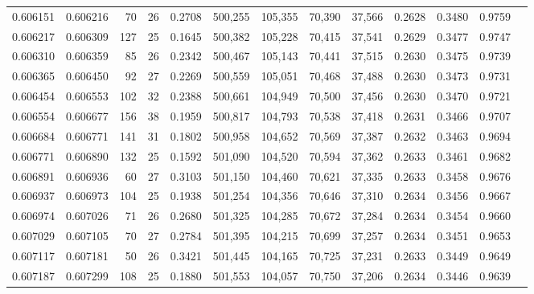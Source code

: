 \begin{tabular}{rrrrrrrrrrrrr}
0.606151 & 0.606216 &  70 &  26 &                                     0.2708 & 500,255 & 105,355 &  70,390 &  37,566 & 0.2628 & 0.3480 & 0.9759 \\
0.606217 & 0.606309 & 127 &  25 &                                     0.1645 & 500,382 & 105,228 &  70,415 &  37,541 & 0.2629 & 0.3477 & 0.9747 \\
0.606310 & 0.606359 &  85 &  26 &                                     0.2342 & 500,467 & 105,143 &  70,441 &  37,515 & 0.2630 & 0.3475 & 0.9739 \\
0.606365 & 0.606450 &  92 &  27 &                                     0.2269 & 500,559 & 105,051 &  70,468 &  37,488 & 0.2630 & 0.3473 & 0.9731 \\
0.606454 & 0.606553 & 102 &  32 &                                     0.2388 & 500,661 & 104,949 &  70,500 &  37,456 & 0.2630 & 0.3470 & 0.9721 \\
0.606554 & 0.606677 & 156 &  38 &                                     0.1959 & 500,817 & 104,793 &  70,538 &  37,418 & 0.2631 & 0.3466 & 0.9707 \\
0.606684 & 0.606771 & 141 &  31 &                                     0.1802 & 500,958 & 104,652 &  70,569 &  37,387 & 0.2632 & 0.3463 & 0.9694 \\
0.606771 & 0.606890 & 132 &  25 &                                     0.1592 & 501,090 & 104,520 &  70,594 &  37,362 & 0.2633 & 0.3461 & 0.9682 \\
0.606891 & 0.606936 &  60 &  27 &                                     0.3103 & 501,150 & 104,460 &  70,621 &  37,335 & 0.2633 & 0.3458 & 0.9676 \\
0.606937 & 0.606973 & 104 &  25 &                                     0.1938 & 501,254 & 104,356 &  70,646 &  37,310 & 0.2634 & 0.3456 & 0.9667 \\
0.606974 & 0.607026 &  71 &  26 &                                     0.2680 & 501,325 & 104,285 &  70,672 &  37,284 & 0.2634 & 0.3454 & 0.9660 \\
0.607029 & 0.607105 &  70 &  27 &                                     0.2784 & 501,395 & 104,215 &  70,699 &  37,257 & 0.2634 & 0.3451 & 0.9653 \\
0.607117 & 0.607181 &  50 &  26 &                                     0.3421 & 501,445 & 104,165 &  70,725 &  37,231 & 0.2633 & 0.3449 & 0.9649 \\
0.607187 & 0.607299 & 108 &  25 &                                     0.1880 & 501,553 & 104,057 &  70,750 &  37,206 & 0.2634 & 0.3446 & 0.9639 \\

\end{tabular}
